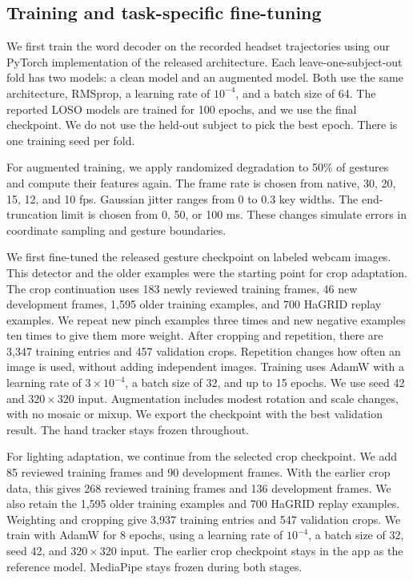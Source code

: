 \documentclass[preprint,12pt]{elsarticle}
\begin{document}
\subsection{Training and task-specific fine-tuning}
We first train the word decoder on the recorded headset trajectories using our PyTorch implementation of the released architecture. Each leave-one-subject-out fold has two models: a clean model and an augmented model. Both use the same architecture, RMSprop, a learning rate of $10^{-4}$, and a batch size of 64. The reported LOSO models are trained for 100 epochs, and we use the final checkpoint. We do not use the held-out subject to pick the best epoch. There is one training seed per fold.

For augmented training, we apply randomized degradation to 50\% of gestures and compute their features again. The frame rate is chosen from native, 30, 20, 15, 12, and 10 fps. Gaussian jitter ranges from 0 to 0.3 key widths. The end-truncation limit is chosen from 0, 50, or 100 ms. These changes simulate errors in coordinate sampling and gesture boundaries.

We first fine-tuned the released gesture checkpoint on labeled webcam images. This detector and the older examples were the starting point for crop adaptation. The crop continuation uses 183 newly reviewed training frames, 46 new development frames, 1,595 older training examples, and 700 HaGRID replay examples. We repeat new pinch examples three times and new negative examples ten times to give them more weight. After cropping and repetition, there are 3,347 training entries and 457 validation crops. Repetition changes how often an image is used, without adding independent images. Training uses AdamW with a learning rate of $3\times10^{-4}$, a batch size of 32, and up to 15 epochs. We use seed 42 and $320\times320$ input. Augmentation includes modest rotation and scale changes, with no mosaic or mixup. We export the checkpoint with the best validation result. The hand tracker stays frozen throughout.

For lighting adaptation, we continue from the selected crop checkpoint. We add 85 reviewed training frames and 90 development frames. With the earlier crop data, this gives 268 reviewed training frames and 136 development frames. We also retain the 1,595 older training examples and 700 HaGRID replay examples. Weighting and cropping give 3,937 training entries and 547 validation crops. We train with AdamW for 8 epochs, using a learning rate of $10^{-4}$, a batch size of 32, seed 42, and $320\times320$ input. The earlier crop checkpoint stays in the app as the reference model. MediaPipe stays frozen during both stages.
\end{document}
